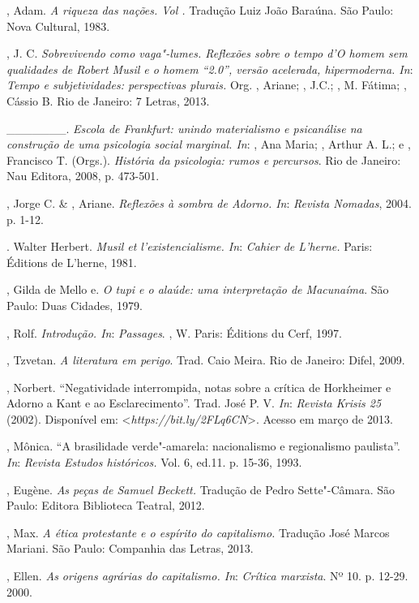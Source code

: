\begin{Parskip}
, Adam. \emph{A riqueza das nações. Vol .} Tradução Luiz João
Baraúna. São Paulo: Nova Cultural, 1983.

, J. C. \emph{Sobrevivendo como vaga"-lumes. Reflexões sobre o tempo
d'\emph{O homem sem qualidades} de Robert Musil e o homem ``2.0'',
versão acelerada, hipermoderna. In}: \emph{Tempo e subjetividades:
perspectivas plurais.} Org. , Ariane; , J.C.; , M.
Fátima; , Cássio B. Rio de Janeiro: 7 Letras, 2013.

\_\_\_\_\_\_\_. \emph{Escola de Frankfurt: unindo materialismo e psicanálise
na construção de uma psicologia social marginal. In}: , Ana Maria; , Arthur A. L.; e , Francisco T. (Orgs.). \emph{História da psicologia: rumos e percursos}. Rio de Janeiro: Nau Editora, 2008, p. 473-501.

, Jorge C. \& , Ariane. \emph{Reflexões à sombra de
Adorno. In}: \emph{Revista Nomadas}, 2004. p. 1-12.

. Walter Herbert. \emph{Musil et l'existencialisme. In}: \emph{Cahier de
L'herne.} Paris: Éditions de L'herne, 1981.

, Gilda de Mello e. \emph{O tupi e o alaúde: uma interpretação de
Macunaíma}. São Paulo: Duas Cidades, 1979.

, Rolf. \emph{Introdução. In}: \emph{Passages}. , W.
Paris: Éditions du Cerf, 1997.

, Tzvetan. \emph{A literatura em perigo}. Trad. Caio Meira. Rio
de Janeiro: Difel, 2009.

, Norbert. ``Negatividade interrompida, notas sobre a crítica de
Horkheimer e Adorno a Kant e ao Esclarecimento''. Trad. José P. V. \emph{In}:
\emph{Revista Krisis 25} (2002). Disponível em:
\textless{}\emph{https://bit.ly/2FLq6CN}\textgreater{}. Acesso em março de 2013.

, Mônica. ``A brasilidade verde"-amarela: nacionalismo e
regionalismo paulista''. \emph{In}: \emph{Revista Estudos históricos.} Vol. 6,
ed.11. p. 15-36, 1993.

, Eugène. \emph{As peças de Samuel Beckett.} Tradução de Pedro
Sette"-Câmara. São Paulo: Editora Biblioteca Teatral, 2012.

, Max. \emph{A ética protestante e o espírito do capitalismo.}
Tradução José Marcos Mariani. São Paulo: Companhia das Letras, 2013.

, Ellen. \emph{As origens agrárias do capitalismo. In}:
\emph{Crítica marxista}. Nº 10. p. 12-29. 2000.
\end{Parskip}